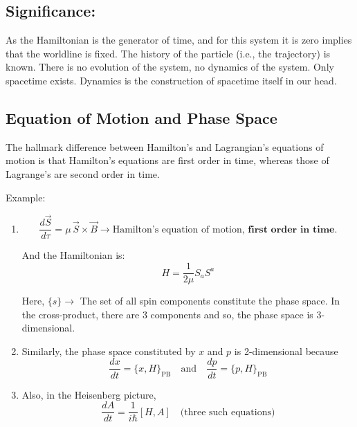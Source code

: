\documentclass[14pt]{article} %
\begin{document}
\subsection*{Significance:}
As the Hamiltonian is the generator of time, and for this system it is zero implies that the worldline is fixed. The history of the particle (i.e., the trajectory) is known. There is no evolution of the system, no dynamics of the system. Only spacetime exists. Dynamics is the construction of spacetime itself in our head.

\subsection*{Equation of Motion and Phase Space}
The hallmark difference between Hamilton's and Lagrangian's equations of motion is that Hamilton's equations are first order in time, whereas those of Lagrange's are second order in time.

Example:

\begin{enumerate}
    \item 
\[
    \frac{d\vec{S}}{d\tau} = \mu \, \vec{S} \times \vec{B}
    \longrightarrow \text{Hamilton's equation of motion,} \textbf{ first order in time.}
\]
    
    And the Hamiltonian is:
\[
    H = \frac{1}{2\mu} S_a S^a
\]
    
    Here, $\{s\} \rightarrow$ The set of all spin components constitute the phase space. In the cross-product, there are 3 components and so, the phase space is 3-dimensional.

    \item 
    Similarly, the phase space constituted by $x$ and $p$ is 2-dimensional because
\[
    \frac{dx}{dt} = \{x, H\}_{\text{PB}} \quad \text{and} \quad \frac{dp}{dt} = \{p, H\}_{\text{PB}}
\]

    \item 
    Also, in the Heisenberg picture,
\[
    \frac{dA}{dt} = \frac{1}{i\hbar} [H, A] \quad \text{(three such equations)}
\]
\end{enumerate}
\end{document}
